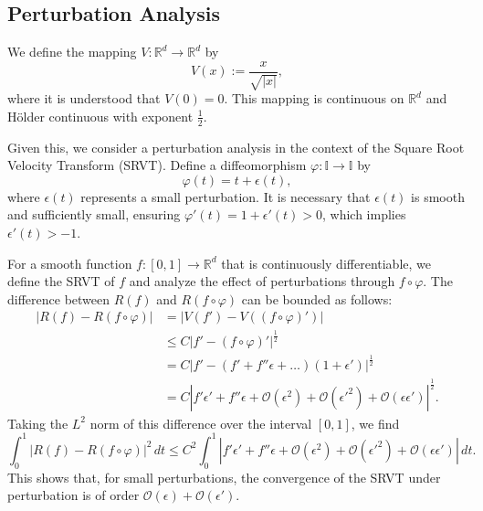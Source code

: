 \subsection{Perturbation Analysis}

We define the mapping \(V: \mathbb{R}^d \rightarrow \mathbb{R}^d\) by
\[
V(x) := \frac{x}{\sqrt{|x|}},
\]
where it is understood that \(V(0) = 0\). This mapping is continuous on \(\mathbb{R}^d\) and Hölder continuous with exponent \(\frac{1}{2}\).

Given this, we consider a perturbation analysis in the context of the Square Root Velocity Transform (SRVT). Define a diffeomorphism \(\varphi: \mathbb{I} \rightarrow \mathbb{I}\) by
\[
\varphi(t) = t + \epsilon(t),
\]
where \(\epsilon(t)\) represents a small perturbation. It is necessary that \(\epsilon(t)\) is smooth and sufficiently small, ensuring \(\varphi'(t) = 1 + \epsilon'(t) > 0\), which implies \(\epsilon'(t) > -1\).

For a smooth function \(f: [0,1] \rightarrow \mathbb{R}^d\) that is continuously differentiable, we define the SRVT of \(f\) and analyze the effect of perturbations through \(f \circ \varphi\). The difference between \(R(f)\) and \(R(f \circ \varphi)\) can be bounded as follows:
\[
\begin{aligned}
\left| R(f) - R(f \circ \varphi) \right| &= \left| V(f') - V((f \circ \varphi)') \right| \\
&\leq C \left| f' - (f \circ \varphi)' \right|^{\frac{1}{2}} \\
&= C \left| f' - (f' + f'' \epsilon + \ldots)(1 + \epsilon') \right|^{\frac{1}{2}} \\
&= C \left| f' \epsilon' + f'' \epsilon + \mathcal{O}(\epsilon^2) + \mathcal{O}(\epsilon'^2) + \mathcal{O}(\epsilon \epsilon') \right|^{\frac{1}{2}}.
\end{aligned}
\]
Taking the \(L^2\) norm of this difference over the interval \([0,1]\), we find
\[
\int_0^1 \left| R(f) - R(f \circ \varphi) \right|^2 \,dt \leq C^2 \int_0^1 \left| f' \epsilon' + f'' \epsilon + \mathcal{O}(\epsilon^2) + \mathcal{O}(\epsilon'^2) + \mathcal{O}(\epsilon \epsilon') \right| \,dt.
\]
This shows that, for small perturbations, the convergence of the SRVT under perturbation is of order \(\mathcal{O}(\epsilon) + \mathcal{O}(\epsilon')\).
